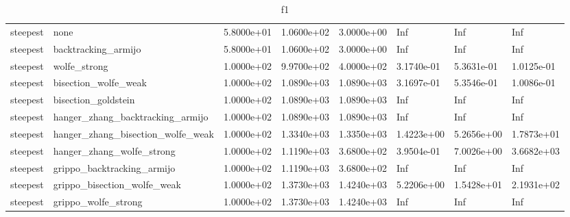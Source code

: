 \documentclass[a4paper,11pt]{article}
\numberwithin{equation}{section} %
\begin{document}
\begin{table}[h!]
{\begin{tabular}{|l|l|l|l|l|l|l|l|}
        steepest & none & 5.8000e+01 & 1.0600e+02 & 3.0000e+00 & Inf & Inf & Inf \\
        steepest & backtracking\_armijo & 5.8000e+01 & 1.0600e+02 & 3.0000e+00 & Inf & Inf & Inf \\
        steepest & wolfe\_strong & 1.0000e+02 & 9.9700e+02 & 4.0000e+02 & 3.1740e-01 & 5.3631e-01 & 1.0125e-01 \\
        steepest & bisection\_wolfe\_weak & 1.0000e+02 & 1.0890e+03 & 1.0890e+03 & 3.1697e-01 & 5.3546e-01 & 1.0086e-01 \\
        steepest & bisection\_goldstein & 1.0000e+02 & 1.0890e+03 & 1.0890e+03 & Inf & Inf & Inf \\
        steepest & hanger\_zhang\_backtracking\_armijo & 1.0000e+02 & 1.0890e+03 & 1.0890e+03 & Inf & Inf & Inf \\
        steepest & hanger\_zhang\_bisection\_wolfe\_weak & 1.0000e+02 & 1.3340e+03 & 1.3350e+03 & 1.4223e+00 & 5.2656e+00 & 1.7873e+01 \\
        steepest & hanger\_zhang\_wolfe\_strong & 1.0000e+02 & 1.1190e+03 & 3.6800e+02 & 3.9504e-01 & 7.0026e+00 & 3.6682e+03 \\
        steepest & grippo\_backtracking\_armijo & 1.0000e+02 & 1.1190e+03 & 3.6800e+02 & Inf & Inf & Inf \\
        steepest & grippo\_bisection\_wolfe\_weak & 1.0000e+02 & 1.3730e+03 & 1.4240e+03 & 5.2206e+00 & 1.5428e+01 & 2.1931e+02 \\
        steepest & grippo\_wolfe\_strong & 1.0000e+02 & 1.3730e+03 & 1.4240e+03 & Inf & Inf & Inf \\

\end{tabular}}
\caption{f1}
\label{table:f1}
\end{table}
\end{document}
